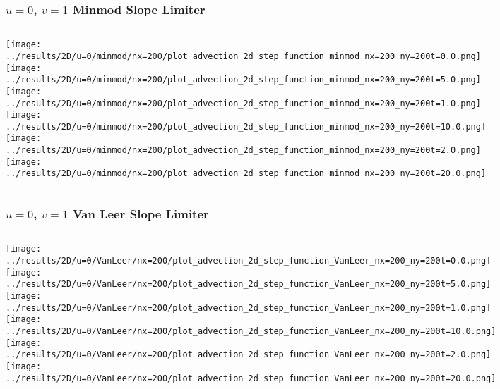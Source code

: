 \begin{frame}
	\frametitle{$u = 0$, $v = 1$ Minmod Slope Limiter}
	\begin{columns}
		\centering
		\texttt{[image: ../results/2D/u=0/minmod/nx=200/plot\_advection\_2d\_step\_function\_minmod\_nx=200\_ny=200t=0.0.png]}\\
		\texttt{[image: ../results/2D/u=0/minmod/nx=200/plot\_advection\_2d\_step\_function\_minmod\_nx=200\_ny=200t=5.0.png]}
		\centering
		\texttt{[image: ../results/2D/u=0/minmod/nx=200/plot\_advection\_2d\_step\_function\_minmod\_nx=200\_ny=200t=1.0.png]}\\
		\texttt{[image: ../results/2D/u=0/minmod/nx=200/plot\_advection\_2d\_step\_function\_minmod\_nx=200\_ny=200t=10.0.png]}
		\centering
		\texttt{[image: ../results/2D/u=0/minmod/nx=200/plot\_advection\_2d\_step\_function\_minmod\_nx=200\_ny=200t=2.0.png]}\\
		\texttt{[image: ../results/2D/u=0/minmod/nx=200/plot\_advection\_2d\_step\_function\_minmod\_nx=200\_ny=200t=20.0.png]}
	\end{columns}
\end{frame}




\begin{frame}
	\frametitle{$u = 0$, $v = 1$ Van Leer Slope Limiter}
	\begin{columns}
		\column{.33\textwidth}
		\centering
		\texttt{[image: ../results/2D/u=0/VanLeer/nx=200/plot\_advection\_2d\_step\_function\_VanLeer\_nx=200\_ny=200t=0.0.png]}\\
		\texttt{[image: ../results/2D/u=0/VanLeer/nx=200/plot\_advection\_2d\_step\_function\_VanLeer\_nx=200\_ny=200t=5.0.png]}
		\column{.33\textwidth}
		\centering
		\texttt{[image: ../results/2D/u=0/VanLeer/nx=200/plot\_advection\_2d\_step\_function\_VanLeer\_nx=200\_ny=200t=1.0.png]}\\
		\texttt{[image: ../results/2D/u=0/VanLeer/nx=200/plot\_advection\_2d\_step\_function\_VanLeer\_nx=200\_ny=200t=10.0.png]}
		\column{.33\textwidth}
		\centering
		\texttt{[image: ../results/2D/u=0/VanLeer/nx=200/plot\_advection\_2d\_step\_function\_VanLeer\_nx=200\_ny=200t=2.0.png]}\\
		\texttt{[image: ../results/2D/u=0/VanLeer/nx=200/plot\_advection\_2d\_step\_function\_VanLeer\_nx=200\_ny=200t=20.0.png]}
	\end{columns}
\end{frame}


